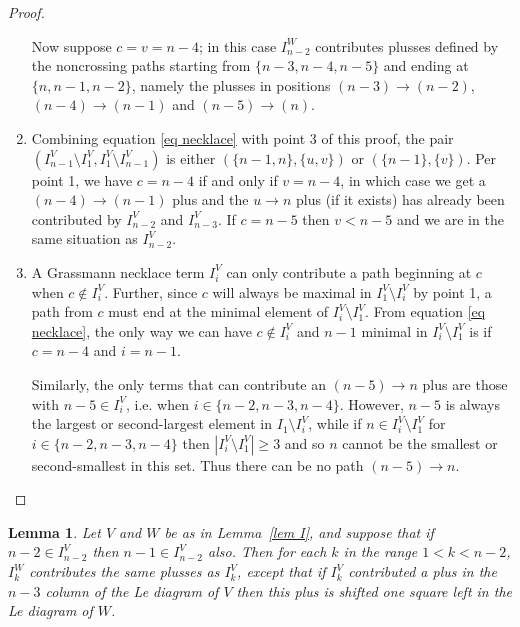 \documentclass[11pt]{article}
\newtheorem{lem}[thm]{Lemma}
\theoremstyle{remark}
\theoremstyle{definition}
\begin{document}
\begin{proof}
\begin{enumerate}
Now suppose $c = v= n-4$; in this case $I_{n-2}^W$ contributes plusses defined by the noncrossing paths starting from $\{n-3, n-4, n-5\}$ and ending at $\{n, n-1, n-2\}$, namely the plusses in positions $(n-3)\rightarrow (n-2)$, $(n-4)\rightarrow (n-1)$ and $(n-5)\rightarrow (n)$.

\item Combining equation \eqref{eq necklace} with point 3 of this proof, the pair $(I_{n-1}^V \setminus I_1^V, I_1^V \setminus I_{n-1}^V)$ is either $(\{n-1, n\}, \{u, v\})$ or $(\{n-1\}, \{v\})$. Per point 1, we have $c = n-4$ if and only if $v = n -4$, in which case we get a $(n-4) \rightarrow (n-1)$ plus and the $u \rightarrow n$ plus (if it exists) has already been contributed by $I_{n-2}^V$ and $I_{n-3}^V$. If $c = n-5$ then $v < n-5$ and we are in the same situation as $I_{n-2}^V$. 

\item A Grassmann necklace term $I_i^V$ can only contribute a path beginning at $c$ when $c \not\in I_i^V$. Further, since $c$ will always be maximal in $I_1^V\setminus I_i^V$ by point 1, a path from $c$ must end at the minimal element of $I_i^V \setminus I_1^V$. From equation \eqref{eq necklace}, the only way we can have $c \not\in I_i^V$ and $n-1$ minimal in $I_i^V \setminus I_1^V$ is if $c = n-4$ and $i = n-1$.

Similarly, the only terms that can contribute an $(n-5) \rightarrow n$ plus are those with $n-5 \in I_i^V$, i.e. when $i \in \{n-2,n-3,n-4\}$. However, $n-5$ is always the largest or second-largest element in $I_1\setminus I_i^V$, while if $n \in I_i^V \setminus I_1^V$ for $i \in \{n-2,n-3,n-4\}$ then $|I_i^V \setminus I_1^V| \geq 3$ and so $n$ cannot be the smallest or second-smallest in this set. Thus there can be no path $(n-5) \rightarrow n$.
\end{enumerate}
\end{proof}


\begin{lem}\label{lem other k}
  Let $V$ and $W$ be as in Lemma~\ref{lem I}, and suppose that if $n-2\in I_{n-2}^{V}$ then $n-1\in I_{n-2}^{V}$ also. Then for each $k$ in the range $1<k<n-2$, $I_k^{W}$ contributes the same plusses as $I_{k}^{V}$, except that if $I_{k}^{V}$ contributed a plus in the $n-3$ column of the Le diagram of $V$ then this plus is shifted one square left in the Le diagram of $W$.
\end{lem}
\end{document}
